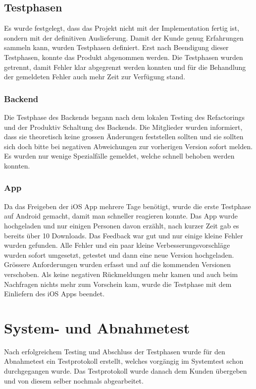 \subsection{Testphasen}
Es wurde festgelegt, dass das Projekt nicht mit der Implementation fertig ist, sondern mit der definitiven Auslieferung. Damit der Kunde genug Erfahrungen sammeln kann, wurden Testphasen definiert. Erst nach Beendigung dieser Testphasen, konnte das Produkt abgenommen werden. Die Testphasen wurden getrennt, damit Fehler klar abgegrenzt werden konnten und für die Behandlung der gemeldeten Fehler auch mehr Zeit zur Verfügung stand.

\subsubsection{Backend}
Die Testphase des Backends begann nach dem lokalen Testing des Refactorings und der Produktiv Schaltung des Backends. Die Mitglieder wurden informiert, dass sie theoretisch keine grossen Änderungen feststellen sollten und sie sollten sich doch bitte bei negativen Abweichungen zur vorherigen Version sofort melden. Es wurden nur wenige Spezialfälle gemeldet, welche schnell behoben werden konnten.

\subsubsection{App}
Da das Freigeben der iOS App mehrere Tage benötigt, wurde die erste Testphase auf Android gemacht, damit man schneller reagieren konnte. Das App wurde hochgeladen und nur einigen Personen davon erzählt, nach kurzer Zeit gab es bereits über 10 Downloads. Das Feedback war gut und nur einige kleine Fehler wurden gefunden. Alle Fehler und ein paar kleine Verbesserungsvorschläge wurden sofort umgesetzt, getestet und dann eine neue Version hochgeladen. Grössere Anforderungen wurden erfasst und auf die kommenden Versionen verschoben. Als keine negativen Rückmeldungen mehr kamen und auch beim Nachfragen nichts mehr zum Vorschein kam, wurde die Testphase mit dem Einliefern des iOS Apps beendet.

\section{System- und Abnahmetest}
Nach erfolgreichem Testing und Abschluss der Testphasen wurde für den Abnahmetest ein Testprotokoll erstellt, welches vorgängig im Systemtest schon durchgegangen wurde. Das Testprotokoll wurde danach dem Kunden übergeben und von diesem selber nochmals abgearbeitet.

